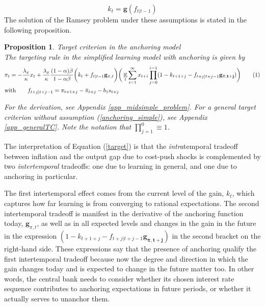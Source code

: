 \documentclass[11pt]{article}
\renewcommand{\[}{\begin{equation}}
\renewcommand{\]}{\end{equation}}
\newtheorem{prop}{Proposition}
\DeclareMathOperator{\E}{\mathbb{E}}
\newcommand\numberthis{\addtocounter{equation}{1}\tag{\theequation}} %
\begin{document}
\begin{equation}
k_t = \mathbf{g}(f_{t|t-1}) \label{anchoring_simple}
\end{equation}
The solution of the Ramsey problem under these assumptions is stated in the following proposition.

\begin{prop} Target criterion in the anchoring model \\
The targeting rule in the simplified learning model with anchoring is given by
\begin{align*}
& \pi_t = -\frac{\lambda_x}{\kappa}x_t + \frac{\lambda_x}{\kappa}\frac{(1-\alpha)\beta}{1-\alpha\beta} \bigg(k_t+f_{t|t-1}\mathbf{g}_{\pi,t} \bigg)\bigg(\E_t\sum_{i=1}^{\infty}x_{t+i}\prod_{j=0}^{i-1}(1-k_{t+1+j} - f_{t+j|t+j-1}\mathbf{g_{\bar{\pi},t+j}}) \bigg)
 \numberthis \label{target} \\
 & \text{with} \quad \quad f_{t+j|t+j-1} = \pi_{t+1+j} - \bar{\pi}_{t+j}-b_1 s_{t+j}
\end{align*}

For the derivation, see Appendix \ref{app_midsimple_problem}. For a general target criterion without assumption (\ref{anchoring_simple}), see Appendix \ref{app_generalTC}. Note the notation that $\prod_{j=1}^{0} \equiv 1$.
\label{result_target_anchoring}
\end{prop}
The interpretation of Equation (\ref{target}) is that the \emph{intra}temporal tradeoff between inflation and the output gap due to cost-push shocks is complemented by two \emph{intertemporal} tradeoffs: one due to learning in general, and one due to anchoring in particular. 

The first intertemporal effect comes from the current level of the gain,  $k_t$, which captures how far learning is from converging to rational expectations. The second intertemporal tradeoff is manifest in the derivative of the anchoring function today,  $\mathbf{g}_{\pi,t}$, as well as in all expected levels and changes in the gain in the future in the expression $(1-k_{t+1+j}- f_{t+j|t+j-1}\mathbf{g_{\bar{\pi},t+j}})$ in the second bracket on the right-hand side. These expressions say that the presence of anchoring qualify the first intertemporal tradeoff because now the degree and direction in which the gain changes today and is expected to change in the future matter too. In other words, the central bank needs to consider whether its chosen interest rate sequence contributes to anchoring expectations in future periods, or whether it actually serves to unanchor them.
\end{document}
